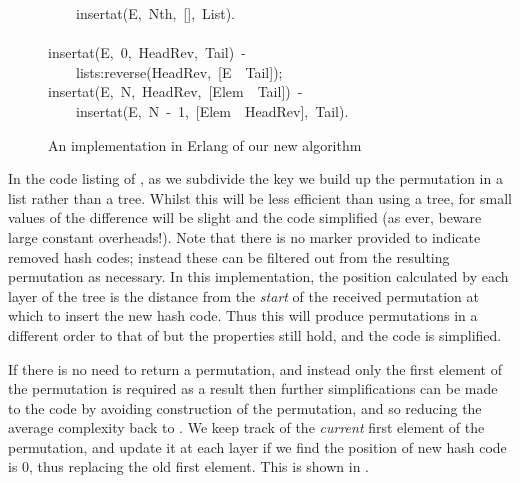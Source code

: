 \documentclass[runningheads,a4paper]{llncs}
\newcommand{\hlstd}[1]{\textcolor[rgb]{0,0,0}{#1}}
\newcommand{\hlnum}[1]{\textcolor[rgb]{0.69,0.49,0}{#1}}
\newcommand{\hlopt}[1]{\textcolor[rgb]{0,0,0}{#1}}
\newcommand{\hlkwd}[1]{\textcolor[rgb]{0,0,0.51}{#1}}
\begin{document}
\begin{figure}
\hlstd{}\hlstd{\ \ \ \ }\hlstd{}\hlkwd{insert\textunderscore at}\hlstd{}\hlopt{(}\hlstd{E}\hlopt{,\ }\hlstd{Nth}\hlopt{,\ {[}{]},\ }\hlstd{List}\hlopt{).}\hspace*{\fill}\\
\hlstd{}\hspace*{\fill}\\
\hlkwd{insert\textunderscore at}\hlstd{}\hlopt{(}\hlstd{E}\hlopt{,\ }\hlstd{}\hlnum{0}\hlstd{}\hlopt{,\ }\hlstd{HeadRev}\hlopt{,\ }\hlstd{Tail}\hlopt{)\ {-}}\hspace*{\fill}\\
\hlstd{}\hlstd{\ \ \ \ }\hlstd{}\hlkwd{lists}\hlstd{}\hlopt{:}\hlstd{}\hlkwd{reverse}\hlstd{}\hlopt{(}\hlstd{HeadRev}\hlopt{,\ {[}}\hlstd{E\ \textbar \ Tail}\hlopt{{]});}\hspace*{\fill}\\
\hlstd{}\hlkwd{insert\textunderscore at}\hlstd{}\hlopt{(}\hlstd{E}\hlopt{,\ }\hlstd{N}\hlopt{,\ }\hlstd{HeadRev}\hlopt{,\ {[}}\hlstd{Elem\ \textbar \ Tail}\hlopt{{]})\ {-}}\hspace*{\fill}\\
\hlstd{}\hlstd{\ \ \ \ }\hlstd{}\hlkwd{insert\textunderscore at}\hlstd{}\hlopt{(}\hlstd{E}\hlopt{,\ }\hlstd{N\ }\hlopt{{-}\ }\hlstd{}\hlnum{1}\hlstd{}\hlopt{,\ {[}}\hlstd{Elem\ \textbar \ HeadRev}\hlopt{{]},\ }\hlstd{Tail}\hlopt{).}\hspace*{\fill}\\
\mbox{}
\normalfont
\normalsize
\caption{An implementation in Erlang of our new algorithm}
\label{fig:code:new}
\end{figure}

In the code listing of , as we subdivide the key we
build up the permutation in a list rather than a tree. Whilst this
will be less efficient than using a tree, for small values of 
the difference will be slight and the code simplified (as ever, beware
large constant overheads!). Note that there is no marker provided to
indicate removed hash codes; instead these can be filtered out from
the resulting permutation as necessary. In this implementation, the
position calculated by each layer of the tree is the distance from the
{\em start} of the received permutation at which to insert the new
hash code. Thus this will produce permutations in a different order to
that of  but the properties still hold, and the
code is simplified.

If there is no need to return a permutation, and instead only the
first element of the permutation is required as a result then further
simplifications can be made to the code by avoiding construction of
the permutation, and so reducing the average complexity back to
. We keep track of the {\em current} first element of the
permutation, and update it at each layer if we find the position of
new hash code is 0, thus replacing the old first element. This is
shown in .
\end{document}
